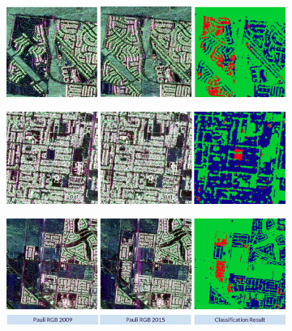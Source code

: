 \begin{figure}[tbp]
\centering
\begin{subfigure}[b]{0.7\textwidth}
		\includegraphics[width=\textwidth]{Figures/CD/ADD/1}
		\caption{}
\end{subfigure}

\begin{subfigure}[b]{0.7\textwidth}
		\includegraphics[width=\textwidth]{Figures/CD/ADD/2}
		\caption{}
\end{subfigure}

\begin{subfigure}[b]{0.7\textwidth}
		\includegraphics[width=\textwidth]{Figures/CD/ADD/3}
		\caption{}
\end{subfigure}


\end{figure}
